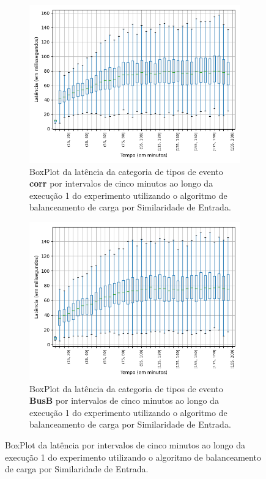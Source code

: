 \begin{figure}
\begin{subfigure}{.5\textwidth}
\centering
\includegraphics[width=\textwidth]{figuras/graphics/boxplot_6-dez-is_corr.png}
\caption{BoxPlot da latência da categoria de tipos de evento \textbf{corr} por intervalos de cinco minutos ao longo da execução 1 do experimento utilizando o algoritmo de balanceamento de carga por Similaridade de Entrada.}
\label{fig:BoxPlot_corr_IS_1}
\end{subfigure}%
\begin{subfigure}{.5\textwidth}
\centering
\includegraphics[width=\textwidth]{figuras/graphics/boxplot_6-dez-is_busb.png}
\caption{BoxPlot da latência da categoria de tipos de evento \textbf{BusB} por intervalos de cinco minutos ao longo da execução 1 do experimento utilizando o algoritmo de balanceamento de carga por Similaridade de Entrada.}
\label{fig:BoxPlot_BusB_IS_1}
\end{subfigure}%
\caption{BoxPlot da latência por intervalos de cinco minutos ao longo da execução 1 do experimento utilizando o algoritmo de balanceamento de carga por Similaridade de Entrada.}
\end{figure}




